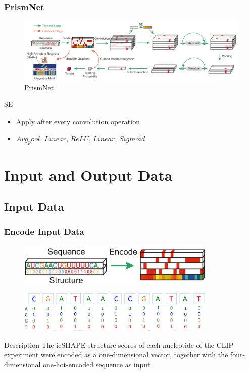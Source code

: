 \documentclass{ctexbeamer}
\begin{document}
\begin{frame}
  \frametitle{PrismNet}
  \begin{figure}[H]
    \centering
    \includegraphics[width=\textwidth]{./figures/CNN.png}
    \caption{PrismNet}
    \label{fig:cnn}
  \end{figure}
  \begin{block}{SE}
    \begin{itemize}
      \item Apply after every convolution operation
      \item $Avg_pool$, $Linear$, $ReLU$, $Linear$, $Sigmoid$
    \end{itemize}
  \end{block}
\end{frame}

\section{Input and Output Data}
\subsection{Input Data}
\begin{frame}
  \frametitle{Encode Input Data}
  \begin{figure}[H]
    \raggedright
    \includegraphics[width=0.85\textwidth]{./figures/input.png}
    \label{fig:input}
  \end{figure}
  \begin{figure}[H]
    \raggedleft
    \includegraphics[width=0.85\textwidth]{./figures/onehot.png}
    \label{fig:onehot}
  \end{figure}
  \begin{block}{Description}
    The icSHAPE structure scores of each nucleotide of the CLIP experiment were encoded as a one-dimensional vector, together with the four-dimensional one-hot-encoded
    sequence as input
  \end{block}
\end{frame}
\end{document}
